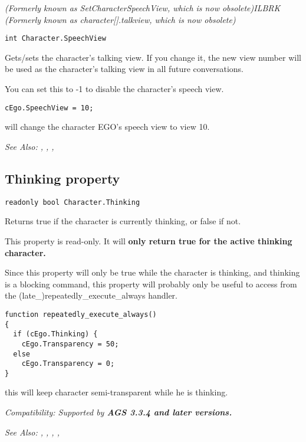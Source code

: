 \it{(Formerly known as SetCharacterSpeechView, which is now obsolete)}ILBRK
\it{(Formerly known as character[].talkview, which is now obsolete)}

\begin{verbatim}
int Character.SpeechView
\end{verbatim}
Gets/sets the character's talking view. If you change it, the new view number will
be used as the character's talking view in all future conversations.

You can set this to -1 to disable the character's speech view.

\begin{verbatim}
cEgo.SpeechView = 10;
\end{verbatim}
will change the character EGO's speech view to view 10.

\it{See Also:} ,
,
,


\subsection{Thinking property}\label{Character.Thinking}%

\begin{verbatim}
readonly bool Character.Thinking
\end{verbatim}
Returns true if the character is currently thinking, or false if not.

This property is read-only. It will \bf{only} return true for the active thinking character.

Since this property will only be true while the character is thinking, and thinking is
a blocking command, this property will probably only be useful to access from
the (late_)repeatedly_execute_always handler.

\begin{verbatim}
function repeatedly_execute_always()
{
  if (cEgo.Thinking) {
    cEgo.Transparency = 50;
  else
    cEgo.Transparency = 0;
}
\end{verbatim}
this will keep character semi-transparent while he is thinking.

\it{Compatibility:} Supported by \bf{AGS 3.3.4} and later versions.

\it{See Also:} ,
,
,
,


